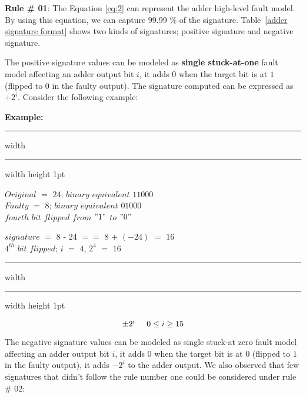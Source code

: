 \textbf{Rule \# 01}: The Equation \ref{eq:2} can represent the adder high-level fault model. By using this equation, we can capture 99.99 \% of the signature. Table~\ref{adder signature format} shows two kinds of signatures; positive signature and negative signature. 

The positive signature values can be modeled as \textbf{single stuck-at-one} fault model affecting an adder output bit $i$,  it adds $0$ when the target bit is at $1$ (flipped to $0$ in the faulty output). The signature computed can be expressed as $+2^{i}$. Consider the following example:

\vspace{ 0.1 cm}
\hspace{-0.3 cm}\textbf{Example:}
\hrule height 2pt width \hsize \kern 1pt \hrule width \hsize height 1pt

\vspace{0.2 cm}
$Original$ $=$ $24$; $binary $ $ equivalent$ $11000$ \\

\hspace{-0.15cm} $Faulty$ $=$ $8$; $binary $ $ equivalent$ $01000$ \\

$fourth$ $bit$ $flipped$ $from$ $"1"$ $to$ $"0"$


$signature$ $=$ $8$ - $24$ $==$ $8$ $+$ $(-24)$ $=$ $16$ \\

$4^{th}$ $ bit $ $flipped$; $i$  $=$ $4$, $2^{4}$ $=$ $16$
\vspace{0.01cm}
\hrule height 2pt width \hsize \kern 1pt \hrule width \hsize height 1pt

\vspace{0.25 cm}

\textit{\begin{equation}
\label{eq:2}
  \pm2\textsuperscript{i}    \hspace{0.5 cm} 0\leq i \geq15
\end{equation}}


















The negative signature values can be modeled as single stuck-at zero fault model affecting an adder output bit $i$, it adds $0$ when the target bit is at $0$ (flipped to $1$ in the faulty output), it adds $-2^i$ to the adder output. 
We also observed that few signatures that didn't follow the rule number one could be considered under rule \# 02: 




